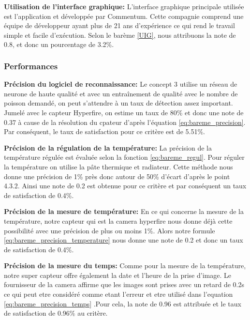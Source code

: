 \textbf{Utilisation de l’interface graphique:} L’interface graphique principale utilisée est l’application et développée par Commentum. Cette compagnie comprend une équipe de développeur ayant plus de 21 ans d’expérience ce qui rend le travail simple et facile d’exécution. Selon le barème \ref{UIG}, nous attribuons la note de 0.8, et donc un pourcentage de 3.2\%.
\vspace{5mm}


\subsubsection{Performances}

\textbf{Précision du logiciel de reconnaissance:}
Le concept 3 utilise un réseau de neurone  de haute qualité et avec un entraînement de qualité avec le nombre de poisson demandé, on peut s’attendre à un taux de détection assez important. Jumelé avec le capteur Hyperfire, on estime un taux de 80\% et donc une note de 0.37 à cause de la résolution du cpateur d’après l’équation \ref{eq:bareme_precision}. Par conséquent, le taux de satisfaction pour ce critère est de 5.51\%.
\vspace{5mm}


\textbf{Précision de la régulation de la température:}
La précision de la température régulée est évaluée selon la fonction \ref{eq:bareme_regul}. Pour réguler la température on utilise la pâte thermique et radiateur. Cette méthode nous donne une précision de 1\% près donc autour de 50\% d’écart d’après le point 4.3.2. Ainsi une note de 0.2 est obtenue pour ce critère et par conséquent un taux de satisfaction de 0.4\%.
\vspace{5mm}


\textbf{Précision de la mesure de température:} En ce qui concerne la mesure de la température, notre capteur qui est la camera hyperfire nous donne déjà cette possibilité avec une précision de plus ou moins 1\%. Alors notre formule \ref{eq:bareme_precision_temperature} nous donne une note de 0.2 et donc un taux de satisfaction de 0.4\%.
\vspace{5mm}


\textbf{Précision de la mesure du temps:} Comme pour la mesure de la température, notre super capteur offre également la date et l’heure de la prise d’image. Le fournisseur de la camera affirme que les images sont prises avec un retard de 0.2s ce qui peut etre considéré comme etant l’erreur et etre utilisé dans l’equation \ref{eq:bareme_precision_temps} .Pour cela, la note de 0.96 est attribuée et le taux de satisfaction de 0.96\% au critère.


